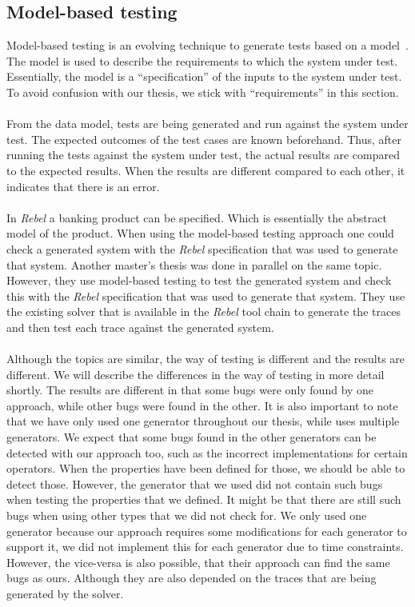 \subsection{Model-based testing}
Model-based testing is an evolving technique to generate tests based on a model~\cite{dalal1999model}. The model is used to describe the requirements to which the system under test. Essentially, the model is a ``specification'' of the inputs to the system under test. To avoid confusion with our thesis, we stick with ``requirements'' in this section.\\
\\
From the data model, tests are being generated and run against the system under test. The expected outcomes of the test cases are known beforehand. Thus, after running the tests against the system under test, the actual results are compared to the expected results. When the results are different compared to each other, it indicates that there is an error.\\
\\
In \textit{Rebel} a banking product can be specified. Which is essentially the abstract model of the product. When using the model-based testing approach one could check a generated system with the \textit{Rebel} specification that was used to generate that system. Another master's thesis was done in parallel on the same topic. However, they use model-based testing to test the generated system and check this with the \textit{Rebel} specification that was used to generate that system. They use the existing solver that is available in the \textit{Rebel} tool chain to generate the traces and then test each trace against the generated system.\\
\\
Although the topics are similar, the way of testing is different and the results are different. We will describe the differences in the way of testing in more detail shortly. The results are different in that some bugs were only found by one approach, while other bugs were found in the other. It is also important to note that we have only used one generator throughout our thesis, while  uses multiple generators. We expect that some bugs found in the other generators can be detected with our approach too, such as the incorrect implementations for certain operators. When the properties have been defined for those, we should be able to detect those. However, the generator that we used did not contain such bugs when testing the properties that we defined. It might be that there are still such bugs when using other types that we did not check for. We only used one generator because our approach requires some modifications for each generator to support it, we did not implement this for each generator due to time constraints. However, the vice-versa is also possible, that their approach can find the same bugs as ours. Although they are also depended on the traces that are being generated by the solver.

